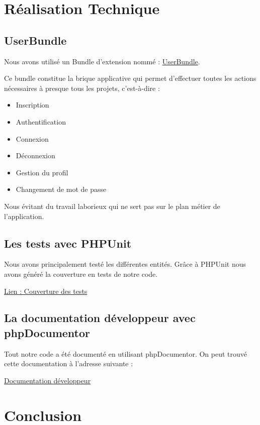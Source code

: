 \documentclass{report}
\begin{document}
  \section{Réalisation Technique}
    \subsection{UserBundle}
      Nous avons utilisé un Bundle d'extension nommé : 
      \href{https://github.com/FriendsOfSymfony/FOSUserBundle}{UserBundle}.
      
      Ce bundle constitue la brique applicative qui permet d'effectuer toutes les actions nécessaires à presque tous les projets, c'est-à-dire :
      \begin{itemize}
        \item{Inscription}
        \item{Authentification}
        \item{Connexion}
        \item{Déconnexion}
        \item{Gestion du profil}
        \item{Changement de mot de passe}
      \end{itemize}
      Nous évitant du travail laborieux qui ne sert pas sur le plan métier de l'application.

    \subsection{Les tests avec PHPUnit}
			Nous avons principalement testé les différentes entités. Grâce à PHPUnit nous avons généré la couverture en tests de notre code.

			\href{http://ares-ensiie.eu/~unbekandt2011/UnsapaIPW/cov}{Lien : Couverture des tests}
    \subsection{La documentation développeur avec phpDocumentor}
			Tout notre code a été documenté en utilisant phpDocumentor. On peut trouvé cette documentation à l'adresse suivante :

			\href{http://ares-ensiie.eu/~unbekandt2011/UnsapaIPW/doc}{Documentation développeur}

  \section*{Conclusion}
\end{document}
